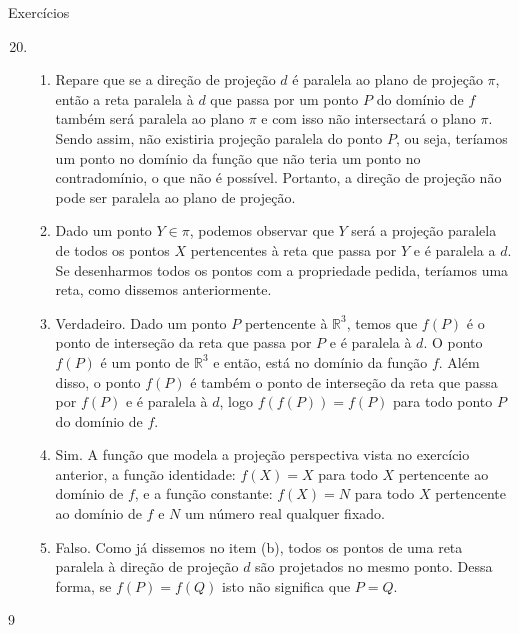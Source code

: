 \begin{answer}{Exercícios}
{\exerciselist
\begin{enumerate}\setcounter{enumi}{19}
\item \begin{enumerate}
\item {} 
Repare que se a direção de projeção \(d\) é paralela ao plano de projeção \(\pi\), então a reta paralela à \(d\) que passa por um ponto \(P\) do domínio de \(f\) também será paralela ao plano \(\pi\) e com isso não intersectará o plano \(\pi\). Sendo assim, não existiria projeção paralela do ponto \(P\), ou seja, teríamos um ponto no domínio da função que não teria um ponto no contradomínio, o que não é possível. Portanto, a direção de projeção não pode ser paralela ao plano de projeção.

\item {} 
Dado um ponto \(Y\in\pi\), podemos observar que \(Y\) será a projeção paralela de todos os pontos \(X\) pertencentes à reta que passa por \(Y\) e é paralela a \(d\). Se desenharmos todos os pontos com a propriedade pedida, teríamos uma reta, como dissemos anteriormente.

\item {} 
Verdadeiro. Dado um ponto \(P\) pertencente à \({\mathbb R}^{3}\), temos que \(f(P)\) é o ponto de interseção da reta que passa por \(P\) e é paralela à \(d\). O ponto \(f(P)\) é um ponto de \({\mathbb R}^{3}\) e então, está no domínio da função \(f\). Além disso, o ponto \(f(P)\) é também o ponto de interseção da reta que passa por \(f(P)\) e é paralela à \(d\), logo \(f(f(P)) = f(P)\) para todo ponto \(P\) do domínio de \(f\).

\item {} 
Sim. A função que modela a projeção perspectiva vista no exercício anterior, a função identidade: \(f(X)=X\) para todo \(X\) pertencente ao domínio de \(f\),  e a função constante: \(f(X)=N\) para todo \(X\) pertencente ao domínio de \(f\) e \(N\) um número real qualquer fixado.

\item {} 
Falso. Como já dissemos no item (b), todos os pontos de uma reta paralela à direção de projeção \(d\) são projetados no mesmo ponto. Dessa forma, se \(f(P)=f(Q)\) isto não significa que \(P=Q\).

\end{enumerate}
\end{enumerate}
}{9}
\end{answer}
\clearmargin

